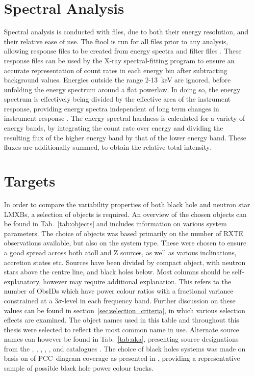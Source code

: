 \section{Spectral Analysis}
Spectral analysis is conducted with  files, due to both their energy resolution, and their relative ease of use. The ftool  is run for all files prior to any analysis, allowing response files to be created from energy spectra and filter files \citep{pcarsp}. These response files can be used by the X-ray spectral-fitting program  \citep{arnaud1996astronomical} to ensure an accurate representation of count rates in each energy bin after subtracting background values. Energies outside the range 2-13~keV are ignored, before unfolding the energy spectrum around a flat powerlaw. In doing so, the energy spectrum is effectively being divided by the effective area of the instrument response, providing energy spectra independent of long term changes in instrument response \citep{heil2015inclination}. The energy spectral hardness is calculated for a variety of energy bands, by integrating the count rate over energy and dividing the resulting flux of the higher energy band by that of the lower energy band. These fluxes are additionally summed, to obtain the relative total intensity.\\


\section{Targets}
In order to compare the variability properties of both black hole and neutron star \acp{LMXB}, a selection of objects is required. An overview of the chosen objects can be found in Tab.~\ref{tab:objects} and includes information on various system parameters. The choice of objects was based primarily on the number of \ac{RXTE} observations available, but also on the system type. These were chosen to ensure a good spread across both atoll and Z sources, as well as various inclinations, accretion states etc. Sources have been divided by compact object, with neutron stars above the centre line, and black holes below. Most columns should be self-explanatory, however  may require additional explanation. This refers to the number of ObsIDs which have power colour ratios with a fractional variance constrained at a 3$\sigma$-level in each frequency band. Further discussion on these values can be found in section~\ref{sec:selection_criteria}, in which various selection effects are examined. The object names used in this table and throughout this thesis were selected to reflect the most common name in use. Alternate source names can however be found in Tab.~\ref{tab:aka}, presenting source designations from the , , , , ,  and  catalogues \citep{SIMBAD}. The choice of black holes systems was made on basis on of \ac{PCC}~diagram coverage as presented in \citet{heil2015power}, providing a representative sample of possible black hole power colour tracks. \\


